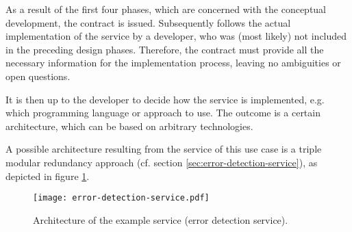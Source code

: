As a result of the first four phases, which are concerned with the conceptual development, the contract is issued. Subsequently follows the actual implementation of the service by a developer, who was (most likely) not included in the preceding design phases. Therefore, the contract must provide all the necessary information for the implementation process, leaving no ambiguities or open questions.

It is then up to the developer to decide how the service is implemented, e.g. which programming language or approach to use. The outcome is a certain architecture, which can be based on arbitrary technologies.

A possible architecture resulting from the service of this use case is a triple modular redundancy approach (cf. section \ref{sec:error-detection-service}), as depicted in figure \ref{fig:example-service-architecture}. 


\begin{figure}[ht]
\centering
\caption{Architecture of the example service (error detection service).}
\label{fig:example-service-architecture}
\texttt{[image: error-detection-service.pdf]}
\end{figure}
